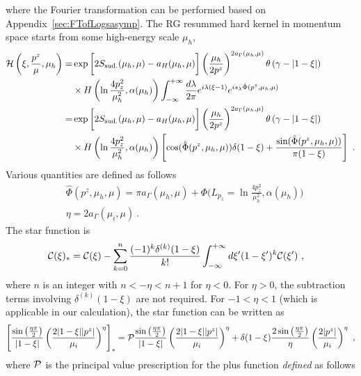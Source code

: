 \documentclass[a4paper,11pt]{article}
\begin{document}
where the Fourier transformation can be performed based on Appendix~\ref{sec:FTofLogsasymp}.
The RG resummed hard kernel in momentum space starts from some
high-energy scale $\mu_h$,
\begin{align}\label{eq:Hmom} 
{\cal H}\left( \xi,\frac{p^z}{\mu},\mu_h\right) 
=&\exp \bigg[2   S_{\rm sud.}(\mu_h,\mu)-   a_{H}(\mu_h,\mu)\bigg] \left(\frac{\mu_h}{2 p^z}\right)^{2a_{\Gamma}(\mu_h,\mu)} \theta\left(\gamma-|1-\xi|\right)  \nonumber\\
&\times   H\left(\ln \frac{4p_z^2}{\mu_h^2},\alpha(\mu_h)\right) \int_{-\infty}^{+\infty} \frac{d\lambda}{2\pi} e^{i \lambda (\xi-1)} e^{i s_{\lambda} \hat \Phi(p^z,\mu_h,\mu)} \nonumber\\
=&\exp \bigg[2  S_{\rm sud.}(\mu_h,\mu)-  a_{H}(\mu_h,\mu)\bigg] \left(\frac{\mu_h}{2 p^z}\right)^{2   a_{\Gamma}(\mu_h,\mu)}  \theta\left(\gamma-|1-\xi|\right) \nonumber\\
&\times   H\left(\ln \frac{4p_z^2}{\mu_h^2},\alpha(\mu_h)\right) \left[ \cos(\hat \Phi(p^z,\mu_h,\mu)) \delta(1-\xi) + \frac{\sin(\hat \Phi(p^z,\mu_h,\mu))}{\pi(1-\xi)}\right] \ .
\end{align}
Various quantities are defined as follows
\begin{align}
&\hat \Phi(p^z,\mu_h,\mu) = \pi a_{\Gamma}(\mu_h,\mu)+  \Phi\bigg(L_{p_z}=\ln \frac{4p_z^2}{\mu_h^2},\alpha(\mu_h)\bigg) \nonumber\\
&  \eta=2   a_{\Gamma}(\mu_i,\mu) \ .
\end{align} 
The star function is 
\begin{align}\label{eq:starf}
&{\cal C}(\xi)_{*} 
= {\cal C}(\xi) - \sum_{k=0}^{n}\frac{(-1)^k\delta^{(k)}(1-\xi)}{k!}\int_{-\infty}^{+\infty} d \xi' (1-\xi')^k {\cal C}(\xi') \ ,
\end{align}
where $n$ is an integer with $n<-\eta<n+1$ for $\eta<0$. For $\eta>0$, the subtraction terms involving $\delta^{(k)}(1-\xi)$ are not required. For $-1<\eta<1$ (which is applicable in our calculation), the star function can be written as
\begin{align}
\left[\frac{\sin \left(\frac{\eta \pi}{2}\right)}{|1-\xi|}\left(\frac{2|1-\xi||p^z|}{\mu_i}\right)^\eta\right]_{*} = {\cal P}\frac{\sin \left(\frac{\eta \pi}{2}\right)}{|1-\xi|}\left(\frac{2|1-\xi||p^z|}{\mu_i}\right)^\eta + \delta(1-\xi) \frac{2\sin \left(\frac{\eta \pi}{2}\right)}{\eta}\left(\frac{2 |p^z|}{\mu_i}\right)^\eta \ ,
\end{align}
where ${\cal P}$ is the principal value prescription for the plus function {\it defined} as follows
\end{document}
